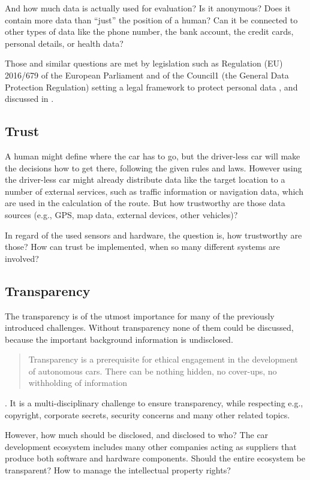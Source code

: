 And how much data is actually used for evaluation? Is it anonymous? Does it contain more data than \enquote{just} the position of a human? Can it be connected to other types of data like the phone number, the bank account, the credit cards, personal details, or health data?

Those and similar questions are met by legislation such as Regulation (EU) 2016/679 of the European Parliament and of the Council1 (the General Data Protection Regulation) setting a legal framework to protect personal data \cite{EuropeanUnion2016}, and discussed in \cite{doi:10.1093/idpl/ipx005}.


\subsection{Trust}
\label{sec:EAofTC:Trust}

A human might define where the car has to go, but the driver-less car will make the decisions how to get there, following the given rules and laws. However using the driver-less car might already distribute data like the target location to a number of external services, such as traffic information or navigation data, which are used in the calculation of the route. But how trustworthy are those data sources (e.g., GPS, map data, external devices, other vehicles)? 

In regard of the used sensors and hardware, the question is, how trustworthy are those? How can trust be implemented, when so many different systems are involved? 


\subsection{Transparency}
\label{sec:EAofTC:Transparency}

The transparency is of the utmost importance for many of the previously introduced challenges. Without transparency none of them could be discussed, because the important background information is undisclosed. \blockquote{Transparency is a prerequisite for ethical engagement in the development of autonomous cars. There can be nothing hidden, no cover-ups, no withholding of information} \cite{McBride:2016:EDC:2874239.2874265}. It is a multi-disciplinary challenge to ensure transparency, while respecting e.g., copyright, corporate secrets, security concerns and many other related topics. 

However, how much should be disclosed, and disclosed to who? The car development ecosystem includes many other companies acting as suppliers that produce both software and hardware components. Should the entire ecosystem be transparent? How to manage the intellectual property rights?

